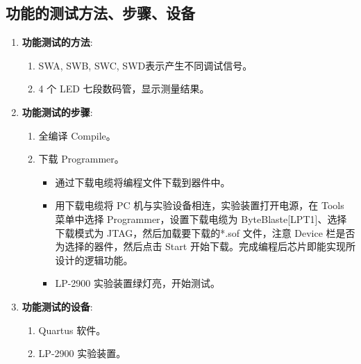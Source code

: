 \documentclass[UTF8,titlepage,a4paper]{ctexart}
\numberwithin{figure}{section}
\begin{document}
\subsection{功能的测试方法、步骤、设备}
\begin{enumerate}
    \item \textbf{功能测试的方法}:
    \begin{enumerate}
        \item SWA, SWB, SWC, SWD表示产生不同调试信号。
        \item 4 个 LED 七段数码管，显示测量结果。
    \end{enumerate}
    
    \item \textbf{功能测试的步骤}:
    \begin{enumerate}
        \item 全编译 Compile。
        \item 下载 Programmer。
        \begin{itemize}
            \item 通过下载电缆将编程文件下载到器件中。
            \item 用下载电缆将 PC 机与实验设备相连，实验装置打开电源，在 Tools 菜单中选择 Programmer，设置下载电缆为 ByteBlaste[LPT1]、选择下载模式为 JTAG，然后加载要下载的*.sof 文件，注意 Device 栏是否为选择的器件，然后点击 Start 开始下载。完成编程后芯片即能实现所设计的逻辑功能。
            \item LP-2900 实验装置绿灯亮，开始测试。
        \end{itemize}
    \end{enumerate}
    
    \item \textbf{功能测试的设备}:
    \begin{enumerate}
        \item Quartus 软件。
        \item LP-2900 实验装置。
    \end{enumerate}
\end{enumerate}

\clearpage
\end{document}
